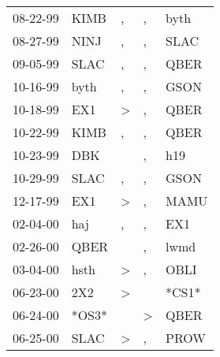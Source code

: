 \begin{supertabular}{p{0.07\textwidth}p{0.06\textwidth}p{0.02\textwidth}p{0.02\textwidth}p{0.06\textwidth}}
 08-22-99\textsuperscript{} &           KIMB\textsuperscript{} &                , &             , &           byth\textsuperscript{} \\
 08-27-99\textsuperscript{} &           NINJ\textsuperscript{} &                , &             , &           SLAC\textsuperscript{} \\
 09-05-99\textsuperscript{} &           SLAC\textsuperscript{} &                , &             , &           QBER\textsuperscript{} \\
 10-16-99\textsuperscript{} &           byth\textsuperscript{} &                , &             , &           GSON\textsuperscript{} \\
 10-18-99\textsuperscript{} &            EX1\textsuperscript{} &     \textgreater &             , &           QBER\textsuperscript{} \\
 10-22-99\textsuperscript{} &           KIMB\textsuperscript{} &                , &             , &           QBER\textsuperscript{} \\
 10-23-99\textsuperscript{} &            DBK\textsuperscript{} &                  &             , &            h19\textsuperscript{} \\
 10-29-99\textsuperscript{} &           SLAC\textsuperscript{} &                , &             , &           GSON\textsuperscript{} \\
 12-17-99\textsuperscript{} &            EX1\textsuperscript{} &     \textgreater &             , &           MAMU\textsuperscript{} \\
 02-04-00\textsuperscript{} &            haj\textsuperscript{} &                , &             , &            EX1\textsuperscript{} \\
 02-26-00\textsuperscript{} &           QBER\textsuperscript{} &                  &             , &           lwmd\textsuperscript{} \\
 03-04-00\textsuperscript{} &           hsth\textsuperscript{} &     \textgreater &             , &           OBLI\textsuperscript{} \\
 06-23-00\textsuperscript{} &            2X2\textsuperscript{} &     \textgreater &               &                            *CS1* \\
 06-24-00\textsuperscript{} &                            *OS3* &                  &  \textgreater &           QBER\textsuperscript{} \\
 06-25-00\textsuperscript{} &           SLAC\textsuperscript{} &     \textgreater &             , &           PROW\textsuperscript{} \\

\end{supertabular}
